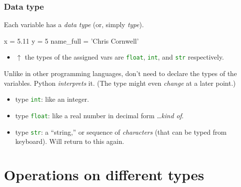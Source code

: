 \documentclass{beamer}
\newenvironment{codeblock}
    {\hfill\begin{beamerboxesrounded}[lower=codecol, width=0.8\textwidth]
    \medskip

    }
    { 
    \end{beamerboxesrounded}\hfill
    }
\theoremstyle{example}
\newcommand{\ct}[1]{\lstinline[language=Python]!#1!}
\begin{document}
\begin{frame}[fragile]
\frametitle{Data type}

Each variable has a \emph{data type} (or, simply \emph{type}). 

\begin{codeblock}

\begin{python}
x = 5.11
y = 5
name_full = 'Chris Cornwell'
\end{python}

\end{codeblock}

\begin{itemize}
	\item[] $\uparrow$ the types of the assigned vars are \ct{float}, \ct{int}, and \ct{str} respectively.
\end{itemize}

\pause
Unlike in other programming languages, don't need to declare the types of the variables. Python \emph{interprets} it. (The type might even \emph{change} at a later point.)

\begin{itemize}
	\item type \ct{int}: like an integer.
	\item type \ct{float}: like a real number in decimal form \ldots \emph{kind of}.
	\item type \ct{str}: a ``string,'' or sequence of \emph{characters} (that can be typed from keyboard). Will return to this again.
\end{itemize}
\end{frame}

\section{Operations on different types}
\end{document}
